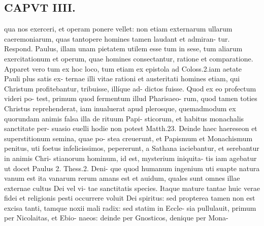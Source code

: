 \documentclass{article}
\begin{document}
\begin{pages}
\section*{CAPVT  IIII. }
\marginpar{[ p.207 ]}qua nos exerceri, et operam ponere vellet: non etiam externarum ullarum caeremoniarum, quas tantopere homines tamen laudant et admiran- tur. Respond. Paulus, illam unam pietatem utilem esse tum in sese, tum aliarum exercitationum et operum, quae homines consectantur, ratione et comparatione. Apparet vero tum ex hoc loco, tum etiam ex epistola ad Coloss.2.iam aetate Pauli plus satis ex- ternae illi vitae rationi et austeritati homines etiam, qui Christum profitebantur, tribuisse, illíque ad- dictos fuisse. Quod ex eo profectum videri po- test, primum quod fermentum illud Pharisaeo- rum, quod tamen toties Christus reprehenderat, iam inualuerat apud plerosque, quemadmodum ex quorundam animis falsa illa de rituum Papi- sticorum, et habitus monachalis sanctitate per- suasio euelli hodie non potest Matth.23. Deinde haec haereseon et superstitionum semina, quae po- stea creuerunt, et Papismum et Monachismum penitus, uti foetus infelicissimos, pepererunt, a Sathana iaciebantur, et serebantur in animis Chri- stianorum hominum, id est, mysterium iniquita- tis iam agebatur ut docet Paulus 2. Thess.2. Deni- que quod humanum ingenium uti suapte natura vanum est ita vanarum rerum amans est et auidum, quales sunt omnes illae externae cultus Dei vel vi- tae sanctitatis species. Itaque mature tantae huic verae fidei et religionis pesti occurrere voluit Dei spiritus: sed propterea tamen non est excisa tanti, tamque noxii mali radix: sed statim in Eccle- sia pullulauit, primum per Nicolaitas, et Ebio- naeos: deinde per Gnosticos, denique per Mona- 

\end{pages}
\end{document}
